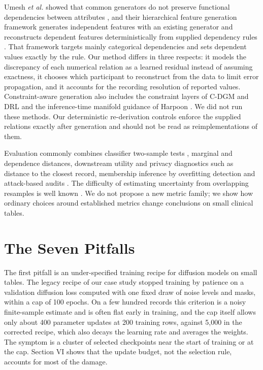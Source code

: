 \documentclass[conference]{IEEEtran}
\begin{document}
Umesh \textit{et al.} showed that common generators do not preserve functional dependencies between attributes \cite{umesh2024dependencies}, and their hierarchical feature generation framework generates independent features with an existing generator and reconstructs dependent features deterministically from supplied dependency rules \cite{umesh2025hfgf}. That framework targets mainly categorical dependencies and sets dependent values exactly by the rule. Our method differs in three respects: it models the discrepancy of each numerical relation as a learned residual instead of assuming exactness, it chooses which participant to reconstruct from the data to limit error propagation, and it accounts for the recording resolution of reported values. Constraint-aware generation also includes the constraint layers of C-DGM \cite{stoian2024cdgm} and DRL \cite{stoian2025drl} and the inference-time manifold guidance of Harpoon \cite{shankar2026harpoon}. We did not run these methods. Our deterministic re-derivation controls enforce the supplied relations exactly after generation and should not be read as reimplementations of them.

Evaluation commonly combines classifier two-sample tests \cite{lopezpaz2017c2st}, marginal and dependence distances, downstream utility and privacy diagnostics such as distance to the closest record, membership inference by overfitting detection \cite{vanbreugel2023domias} and attack-based audits \cite{giomi2023anonymeter}. The difficulty of estimating uncertainty from overlapping resamples is well known \cite{bengio2004variance}. We do not propose a new metric family; we show how ordinary choices around established metrics change conclusions on small clinical tables.

\section{The Seven Pitfalls}

The first pitfall is an under-specified training recipe for diffusion models on small tables. The legacy recipe of our case study stopped training by patience on a validation diffusion loss computed with one fixed draw of noise levels and masks, within a cap of 100 epochs. On a few hundred records this criterion is a noisy finite-sample estimate and is often flat early in training, and the cap itself allows only about 400 parameter updates at 200 training rows, against 5,000 in the corrected recipe, which also decays the learning rate and averages the weights. The symptom is a cluster of selected checkpoints near the start of training or at the cap. Section VI shows that the update budget, not the selection rule, accounts for most of the damage.
\end{document}

